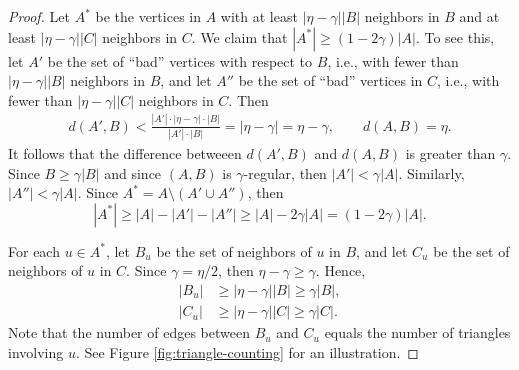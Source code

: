 \documentclass[10pt]{article}
\begin{document}
\begin{proof}
  Let $A^*$ be the vertices in $A$ with at least $|\eta - \gamma| |B|$ neighbors in $B$ and at least $|\eta - \gamma| |C|$ neighbors in $C$. We claim that $|A^*| \geq (1 - 2\gamma) |A|$. To see this, let $A'$ be the set of ``bad'' vertices with respect to $B$, i.e., with fewer than $|\eta - \gamma| |B|$ neighbors in $B$, and let $A''$ be the set of ``bad'' vertices in $C$, i.e., with fewer than $|\eta - \gamma| |C|$ neighbors in $C$. Then
  \begin{gather*}
    d\left(A', B\right) < \frac{\left|A'\right| \cdot |\eta - \gamma| \cdot |B|}{\left|A'\right| \cdot |B|} = |\eta - \gamma| = \eta - \gamma, \qquad d(A, B) = \eta.
  \end{gather*}
  It follows that the difference betweeen $d(A', B)$ and $d(A, B)$ is greater than $\gamma$. Since $B \geq \gamma |B|$ and since $(A, B)$ is $\gamma$-regular, then $|A'| < \gamma |A|$. Similarly, $|A''| < \gamma |A|$. Since $A^* = A \setminus (A' \cup A'')$, then
  $$ \left|A^*\right| \geq |A| - \left|A'\right| - \left|A''\right| \geq |A| - 2\gamma |A| = (1 - 2\gamma) |A|. $$

  For each $u \in A^*$, let $B_u$ be the set of neighbors of $u$ in $B$, and let $C_u$ be the set of neighbors of $u$ in $C$. Since $\gamma = \eta/2$, then $\eta - \gamma \geq \gamma$. Hence,
  \begin{align*}
    \left|B_u\right| &\geq |\eta - \gamma| |B| \geq \gamma |B|, \\
    \left|C_u\right| &\geq |\eta - \gamma| |C| \geq \gamma |C|.
  \end{align*}
  Note that the number of edges between $B_u$ and $C_u$ equals the number of triangles involving $u$. See Figure \ref{fig:triangle-counting} for an illustration.
  

\end{proof}
\end{document}
